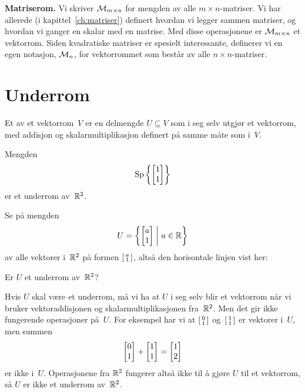 
\medskip\noindent\textbf{Matriserom. }%
Vi skriver $\mathcal{M}_{m \times n}$ for mengden av alle
$m \times n$-matriser.  Vi har allerede (i kapittel~\ref{ch:matriser})
definert hvordan vi legger sammen matriser, og hvordan vi ganger en
skalar med en matrise.  Med disse operasjonene er $\mathcal{M}_{m \times n}$ et
vektorrom.  Siden kvadratiske matriser er spesielt interessante,
definerer vi en egen notasjon, $\mathcal{M}_n$, for vektorrommet som består av
alle $n \times n$-matriser.





\section*{Underrom}

\begin{defn}
Et  av et vektorrom~$V$ er en delmengde
$U \subseteq V$ som i seg selv utgjør et vektorrom, med addisjon og
skalarmultiplikasjon definert på samme måte som i~$V$.
\end{defn}

\begin{ex}
Mengden
\[
\operatorname{Sp} \left\{ \begin{bmatrix} 1 \\ 1 \end{bmatrix} \right\}
\]
er et underrom av~$\mathbb{R}^2$.
\end{ex}


\begin{ex}
\label{ex:ikke-underrom}
Se på mengden
\[
U = \left\{ \begin{bmatrix} a \\ 1 \end{bmatrix} \;\middle|\ a \in \mathbb{R} \right\}
\]
av alle vektorer i~$\mathbb{R}^2$ på formen $\left[ \begin{smallmatrix} a \\ 1 \end{smallmatrix} \right]$, altså den
horisontale linjen vist her:
\begin{center}
\end{center}
Er $U$ et underrom av~$\mathbb{R}^2$?

Hvis $U$ skal være et underrom, må vi ha at $U$ i seg selv blir et
vektorrom når vi bruker vektoraddisjonen og skalarmultiplikasjonen
fra~$\mathbb{R}^2$.  Men det gir ikke fungerende operasjoner på~$U$.  For
eksempel har vi at $\left[ \begin{smallmatrix} 0 \\ 1 \end{smallmatrix} \right]$ og~$\left[ \begin{smallmatrix} 1 \\ 1 \end{smallmatrix} \right]$ er vektorer i~$U$, men
summen
\[
\begin{bmatrix} 0 \\ 1 \end{bmatrix} + \begin{bmatrix} 1 \\ 1 \end{bmatrix} = \begin{bmatrix} 1 \\ 2 \end{bmatrix}
\]
er ikke i~$U$.  Operasjonene fra $\mathbb{R}^2$ fungerer altså ikke til å
gjøre $U$ til et vektorrom, så $U$ er ikke et underrom av~$\mathbb{R}^2$.
\end{ex}

